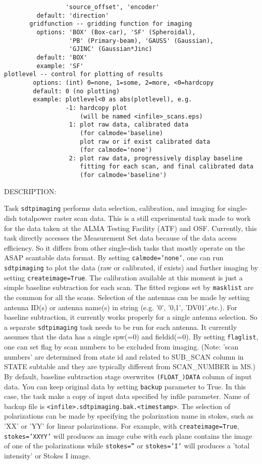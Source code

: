 \begin{verbatim}
                 'source_offset', 'encoder' 
         default: 'direction'
       gridfunction -- gridding function for imaging
         options: 'BOX' (Box-car), 'SF' (Spheroidal), 
                  'PB' (Primary-beam), 'GAUSS' (Gaussian),
                  'GJINC' (Gaussian*Jinc)
         default: 'BOX'
         example: 'SF'
plotlevel -- control for plotting of results
        options: (int) 0=none, 1=some, 2=more, <0=hardcopy
        default: 0 (no plotting)
        example: plotlevel<0 as abs(plotlevel), e.g.
                 -1: hardcopy plot 
                     (will be named <infile>_scans.eps)
                  1: plot raw data, calibrated data 
                     (for calmode='baseline)
                     plot raw or if exist calibrated data 
                     (for calmode='none')
                  2: plot raw data, progressively display baseline 
                     fitting for each scan, and final calibrated data 
                     (for calmode='baseline')  

\end{verbatim}
DESCRIPTION:

Task {\tt sdtpimaging} performs data selection, calibration, and imaging for single-dish
totalpower raster scan data.  This is a still experimental task made to work for
the data taken at the ALMA Testing Facility (ATF) and OSF. Currently, this task directly
accesses the Measurement Set data because of the data access efficiency.
So it differs from other single-dish tasks that mostly operate on the ASAP scantable
data format.  By setting {\tt calmode='none'}, one can run {\tt sdtpimaging} to plot the data
(raw or calibrated, if exists) and further imaging by setting {\tt createimage=True}.
The calibration available at this moment is just a simple baseline subtraction for
each scan. The fitted regions set by {\tt masklist} are the common for all the scans.
Selection of the antennas can be made by setting antenna ID(s) or antenna name(s)
in string (e.g. '0', '0,1', 'DV01',etc.).
For baseline subtraction, it currently works properly for a single antenna selection.
So a separate {\tt sdtpimaging} task needs to be run for each antenna.
It currently assumes that the data has a single spw(=0) and fieldid(=0).
By setting {\tt flaglist}, one can set flag by scan numbers to be excluded from imaging.
(Note: 'scan numbers' are determined from state id and related to SUB\_SCAN column in STATE
subtable and they are typically different from SCAN\_NUMBER in MS.)
By default, baseline subtraction stage overwrites \verb!(FLOAT_)DATA! column of input data. You can 
keep original data by setting {\tt backup} parameter to True. In this case, the task make a 
copy of input data specified by infile parameter. 
Name of backup file is \verb|<infile>.sdtpimaging.bak.<timestamp>|. 
The selection of polarizations can be made by specifying the polarization name in stokes,
such as 'XX' or 'YY' for linear polarizations. For example, with {\tt createimage=True},
{\tt stokes='XXYY'} will produces an image cube with each plane contains the image of one of 
the polarizations while {\tt stokes=''} or {\tt stokes='I'} will produces a 'total intensity' or Stokes I image. 

